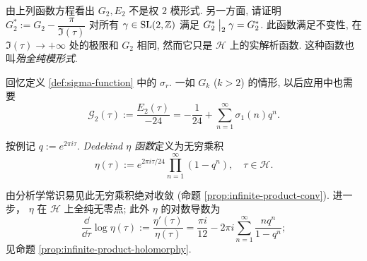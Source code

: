 \begin{exercise}\label{exo:G2} 
	由上列函数方程看出 $G_2, E_2$ 不是权 $2$ 模形式. 另一方面, 请证明 $G_2^* := G_2 - \dfrac{\pi}{\Im(\tau)}$ 对所有 $\gamma \in \operatorname{SL}(2,\mathbb{Z})$ 满足 $G^*_2 \;\big|_{2} \; \gamma = G_2^*$. 此函数满足不变性, 在 $\Im(\tau) \to +\infty$ 处的极限和 $G_2$ 相同, 然而它只是 $\mathcal{H}$ 上的实解析函数. 这种函数也叫\emph{殆全纯模形式}.
\end{exercise}

回忆定义 \ref{def:sigma-function} 中的 $\sigma_r$. 一如 $G_k$ ($k > 2$) 的情形, 以后应用中也需要 
\[ \mathcal{G}_2(\tau) := \dfrac{E_2(\tau)}{-24} = -\dfrac{1}{24} + \sum_{n=1}^\infty  \sigma_1(n) q^n. \]

\begin{definition} 
	按例记 $q := e^{2\pi i \tau}$.	\emph{Dedekind $\eta$ 函数}定义为无穷乘积
	\[ \eta(\tau) := e^{2\pi i \tau/24} \prod_{n=1}^\infty (1 - q^n), \quad \tau \in \mathcal{H}. \]
\end{definition}
由分析学常识易见此无穷乘积绝对收敛 (命题 \ref{prop:infinite-product-conv}). 进一步， $\eta$ 在 $\mathcal{H}$ 上全纯无零点; 此外 $\eta$ 的对数导数为
\[ \frac{\dd}{\dd\tau} \log \eta (\tau) := \frac{\eta'(\tau)}{\eta(\tau)} = \frac{\pi i}{12} - 2\pi i \sum_{n=1}^\infty \frac{n q^n}{1 - q^n} ; \]
见命题 \ref{prop:infinite-product-holomorphy}.

